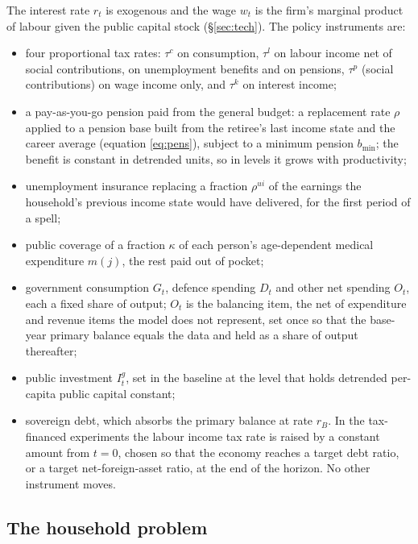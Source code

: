\documentclass[11pt,a4paper]{article}
\begin{document}
The interest rate $r_t$ is exogenous and the wage $w_t$ is the firm's marginal product of labour given the public capital stock (\S\ref{sec:tech}). The policy instruments are:
\begin{itemize}
\item four proportional tax rates: $\tau^c$ on consumption, $\tau^l$ on labour income net of social contributions, on unemployment benefits and on pensions, $\tau^p$ (social contributions) on wage income only, and $\tau^k$ on interest income;
\item a pay-as-you-go pension paid from the general budget: a replacement rate $\rho$ applied to a pension base built from the retiree's last income state and the career average (equation \eqref{eq:pens}), subject to a minimum pension $b_{\min}$; the benefit is constant in detrended units, so in levels it grows with productivity;
\item unemployment insurance replacing a fraction $\rho^{ui}$ of the earnings the household's previous income state would have delivered, for the first period of a spell;
\item public coverage of a fraction $\kappa$ of each person's age-dependent medical expenditure $m(j)$, the rest paid out of pocket;
\item government consumption $G_t$, defence spending $D_t$ and other net spending $O_t$, each a fixed share of output; $O_t$ is the balancing item, the net of expenditure and revenue items the model does not represent, set once so that the base-year primary balance equals the data and held as a share of output thereafter;
\item public investment $I^g_t$, set in the baseline at the level that holds detrended per-capita public capital constant;
\item sovereign debt, which absorbs the primary balance at rate $r_B$. In the tax-financed experiments the labour income tax rate is raised by a constant amount from $t = 0$, chosen so that the economy reaches a target debt ratio, or a target net-foreign-asset ratio, at the end of the horizon. No other instrument moves.
\end{itemize}

\subsection{The household problem}
\end{document}
